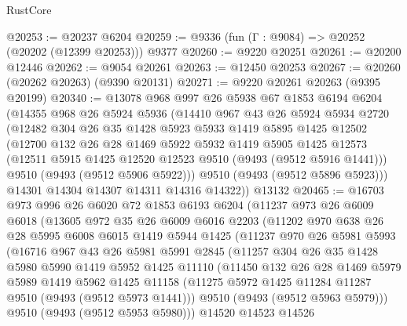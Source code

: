 \begin{lexlean}{RustCore}
\begin{coremodule}
@20253 := @20237 @6204
@20259 := @9336 (fun (Γ : @9084) => @20252 (@20202 (@12399 @20253))) @9377
@20260 := @9220 @20251
@20261 := @20200 @12446
@20262 := @9054 @20261
@20263 := @12450 @20253
@20267 := @20260 (@20262 @20263) (@9390 @20131)
@20271 := @9220 @20261 @20263 (@9395 @20199)
@20340 := @13078
    @968
    @997
    @26
    @5938
    @67
    @1853
    @6194
    @6204
    (@14355
      @968
      @26
      @5924
      @5936
      (@14410
        @967
        @43
        @26
        @5924
        @5934
        @2720
        (@12482
          @304
          @26
          @35
          @1428
          @5923
          @5933
          @1419
          @5895
          @1425
          @12502
          (@12700
            @132
            @26
            @28
            @1469
            @5922
            @5932
            @1419
            @5905
            @1425
            @12573
            (@12511 @5915 @1425 @12520 @12523 @9510 (@9493 (@9512 @5916 @1441)))
            @9510
            (@9493 (@9512 @5906 @5922)))
          @9510
          (@9493 (@9512 @5896 @5923)))
        @14301
        @14304
        @14307
        @14311
        @14316
        @14322))
    @13132
@20465 := @16703
    @973
    @996
    @26
    @6020
    @72
    @1853
    @6193
    @6204
    (@11237
      @973
      @26
      @6009
      @6018
      (@13605
        @972
        @35
        @26
        @6009
        @6016
        @2203
        (@11202
          @970
          @638
          @26
          @28
          @5995
          @6008
          @6015
          @1419
          @5944
          @1425
          (@11237
            @970
            @26
            @5981
            @5993
            (@16716
              @967
              @43
              @26
              @5981
              @5991
              @2845
              (@11257
                @304
                @26
                @35
                @1428
                @5980
                @5990
                @1419
                @5952
                @1425
                @11110
                (@11450
                  @132
                  @26
                  @28
                  @1469
                  @5979
                  @5989
                  @1419
                  @5962
                  @1425
                  @11158
                  (@11275 @5972 @1425 @11284 @11287 @9510 (@9493 (@9512 @5973 @1441)))
                  @9510
                  (@9493 (@9512 @5963 @5979)))
                @9510
                (@9493 (@9512 @5953 @5980)))
              @14520
              @14523
              @14526

\end{coremodule}
\end{lexlean}
